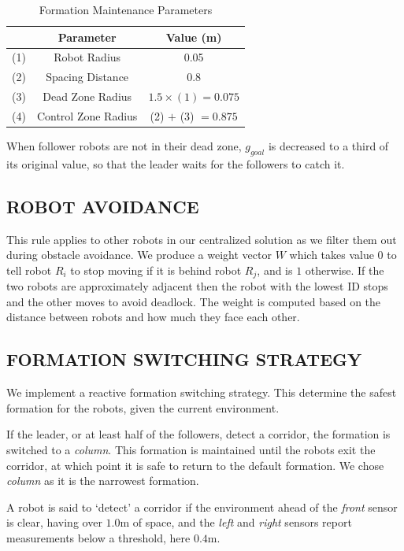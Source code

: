 \documentclass[letterpaper, 10 pt, conference]{ieeeconf}  %
\begin{document}
\begin{table}[h]
\begin{center}
\begin{tabular}{|c|c|c|}
\hline
& Parameter & Value (m) \\
\hline
(1) & Robot Radius             & 0.05 \\
(2) & Spacing Distance        & 0.8 \\
(3) & Dead Zone Radius      & $1.5 \times (1) = 0.075$ \\
(4) & Control Zone Radius    & (2) $+$ (3) $=0.875$ \\
\hline
\end{tabular}
\end{center}
\caption{Formation Maintenance Parameters}
\label{table_formation}
\end{table}

When follower robots are not in their dead zone, $g_{goal}$ is decreased to a third of its original value, so that the leader waits for the followers to catch it.

\subsection{ROBOT AVOIDANCE}

This rule applies to other robots in our centralized solution as we filter them out during obstacle avoidance. We produce a weight vector $W$ which takes value $0$ to tell robot $R_i$ to stop moving if it is behind robot $R_j$, and is $1$ otherwise. If the two robots are approximately adjacent then the robot with the lowest ID stops and the other moves to avoid deadlock. The weight is computed based on the distance between robots and how much they face each other.

\subsection{FORMATION SWITCHING STRATEGY}

We implement a reactive formation switching strategy. This determine the safest formation for the robots, given the current environment.

If the leader, or at least half of the followers, detect a corridor, the formation is switched to a \textit{column}. This formation is maintained until the robots exit the corridor, at which point it is safe to return to the default formation. We chose \textit{column} as it is the narrowest formation.

A robot is said to `detect' a corridor if the environment ahead of the \textit{front} sensor is clear, having over $1.0$m of space, and the \textit{left} and \textit{right} sensors report measurements below a threshold, here $0.4$m.
\end{document}
